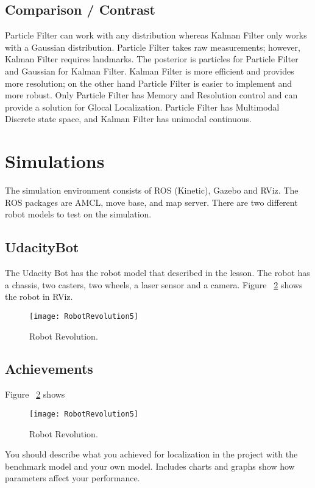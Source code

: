\documentclass[10pt,journal,compsoc]{IEEEtran}
\begin{document}
\subsection{Comparison / Contrast}
Particle Filter can work with any distribution whereas Kalman Filter only works with a Gaussian distribution. Particle Filter takes raw measurements; however, Kalman Filter requires landmarks. The posterior is particles for Particle Filter and Gaussian for Kalman Filter. Kalman Filter is more efficient and provides more resolution; on the other hand Particle Filter is easier to implement and more robust. Only Particle Filter has Memory and Resolution control and can provide a solution for Glocal Localization. Particle Filter has Multimodal Discrete state space, and Kalman Filter has unimodal continuous.

\section{Simulations}
The simulation environment consists of ROS (Kinetic), Gazebo and RViz. The ROS packages are AMCL, move base, and map server. There are two different robot models to test on the simulation.

\subsection{UdacityBot}
The Udacity Bot has the robot model that described in the lesson. The robot has a chassis, two casters, two wheels, a laser sensor and a camera. Figure ~\ref{fig:robot1} shows the robot in RViz.

\begin{figure}[thpb]
      \centering
      \texttt{[image: RobotRevolution5]}
      \caption{Robot Revolution.}
      \label{fig:robot1}
\end{figure}


\subsection{Achievements}
Figure ~\ref{fig:robot1} shows

\begin{figure}[thpb]
      \centering
      \texttt{[image: RobotRevolution5]}
      \caption{Robot Revolution.}
      \label{fig:robot1}
\end{figure}


You should describe what you achieved for localization in the project with the benchmark model and your own model. Includes charts and graphs show how parameters affect your performance.
\end{document}
